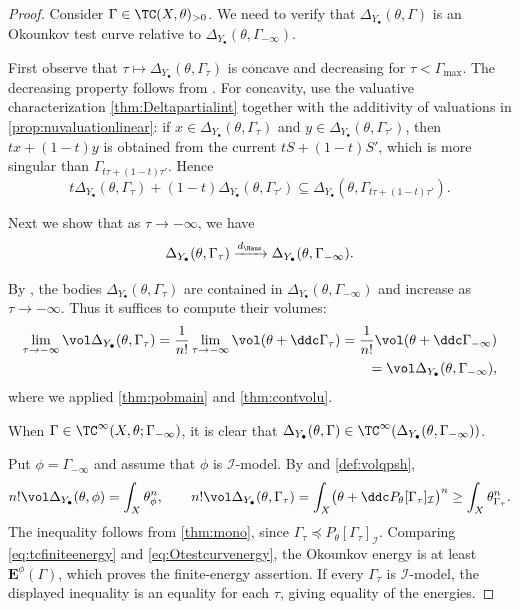 \begin{proof}
    Consider $\Gamma\in \TC(X,\theta)_{>0}$. We need to verify that $\Delta_{Y_{\bullet}}(\theta,\Gamma)$ is an Okounkov test curve relative to $\Delta_{Y_{\bullet}}(\theta,\Gamma_{-\infty})$.

    First observe that $\tau\mapsto \Delta_{Y_{\bullet}}(\theta,\Gamma_{\tau})$ is concave and decreasing for $\tau<\Gamma_{\max}$. The decreasing property follows from . For concavity, use the valuative characterization \cref{thm:Deltapartialint} together with the additivity of valuations in \cref{prop:nuvaluationlinear}: if $x\in\Delta_{Y_\bullet}(\theta,\Gamma_\tau)$ and $y\in\Delta_{Y_\bullet}(\theta,\Gamma_{\tau'})$, then $tx+(1-t)y$ is obtained from the current $tS+(1-t)S'$, which is more singular than $\Gamma_{t\tau+(1-t)\tau'}$. Hence
    \[
        t\Delta_{Y_\bullet}\left(\theta,\Gamma_\tau\right)+(1-t)\Delta_{Y_\bullet}\left(\theta,\Gamma_{\tau'}\right)\subseteq\Delta_{Y_\bullet}\left(\theta,\Gamma_{t\tau+(1-t)\tau'}\right).
    \]

    Next we show that as $\tau\to -\infty$, we have
    \[
    \Delta_{Y_{\bullet}}(\theta,\Gamma_{\tau})\xrightarrow{d_{\Haus}}\Delta_{Y_{\bullet}}(\theta,\Gamma_{-\infty}).
    \]

    By , the bodies $\Delta_{Y_{\bullet}}(\theta,\Gamma_{\tau})$ are contained in $\Delta_{Y_{\bullet}}(\theta,\Gamma_{-\infty})$ and increase as $\tau\to-\infty$. Thus it suffices to compute their volumes:
    \[
    \begin{split}
    \lim_{\tau\to -\infty}\vol \Delta_{Y_{\bullet}}(\theta,\Gamma_{\tau})=\frac{1}{n!}\lim_{\tau\to -\infty}\vol (\theta+\ddc\Gamma_{\tau})=\frac{1}{n!}\vol (\theta+\ddc \Gamma_{-\infty}) \\
    =\vol \Delta_{Y_{\bullet}}(\theta,\Gamma_{-\infty}),
    \end{split}
    \]
    where we applied \cref{thm:pobmain} and \cref{thm:contvolu}.

    When $\Gamma\in \TC^{\infty}(X,\theta;\Gamma_{-\infty})$, it is clear that $\Delta_{Y_{\bullet}}(\theta,\Gamma)\in \TC^{\infty}(\Delta_{Y_{\bullet}}(\theta,\Gamma_{-\infty}))$.

    Put $\phi=\Gamma_{-\infty}$ and assume that $\phi$ is $\mathcal I$-model. By  and \cref{def:volqpsh},
    \[
        n!\vol\Delta_{Y_{\bullet}}(\theta,\phi)=\int_X\theta_\phi^n,\qquad
        n!\vol\Delta_{Y_{\bullet}}(\theta,\Gamma_\tau)
        =\int_X\bigl(\theta+\ddc P_\theta[\Gamma_\tau]_{\mathcal I}\bigr)^n
        \geq \int_X\theta_{\Gamma_\tau}^n.
    \]
    The inequality follows from \cref{thm:mono}, since $\Gamma_\tau\preceq P_\theta[\Gamma_\tau]_{\mathcal I}$. Comparing \eqref{eq:tcfiniteenergy} and \eqref{eq:Otestcurvenergy}, the Okounkov energy is at least $\mathbf{E}^\phi(\Gamma)$, which proves the finite-energy assertion. If every $\Gamma_\tau$ is $\mathcal I$-model, the displayed inequality is an equality for each $\tau$, giving equality of the energies.
\end{proof}


